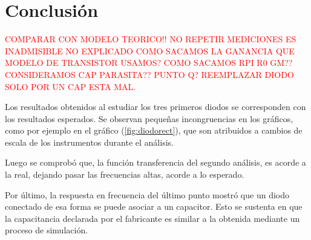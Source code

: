 \documentclass[a4paper]{article}
\begin{document}
\section*{Conclusión}

\textcolor{red}{COMPARAR CON MODELO TEORICO!!}
\textcolor{red}{NO REPETIR MEDICIONES ES INADMISIBLE}
\textcolor{red}{NO EXPLICADO COMO SACAMOS LA GANANCIA}
\textcolor{red}{QUE MODELO DE TRANSISTOR USAMOS? COMO SACAMOS RPI R0 GM?? CONSIDERAMOS CAP PARASITA?? PUNTO Q?}
\textcolor{red}{REEMPLAZAR DIODO SOLO POR UN CAP ESTA MAL.}

Los resultados obtenidos al estudiar los tres primeros diodos se corresponden con los resultados esperados. Se observan pequeñas incongruencias en los gráficos, como por ejemplo en el gráfico (\ref{fig:diodorect}), que son atribuidos a cambios de escala de los instrumentos durante el análisis.

Luego se comprobó que, la función transferencia del segundo análisis, es acorde a la real, dejando pasar las frecuencias altas, acorde a lo esperado.

Por último, la respuesta en frecuencia del último punto mostró que un diodo conectado de esa forma se puede asociar a un capacitor. Esto se sustenta en que la capacitancia declarada por el fabricante es similar a la obtenida mediante un proceso de simulación.
\end{document}
